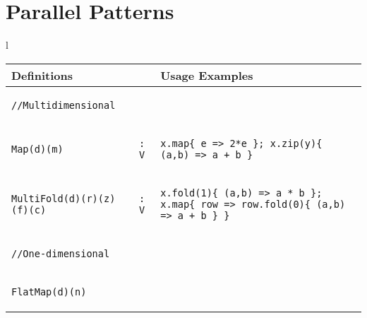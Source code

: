 \documentclass[pageno]{jpaper}
\begin{document}
 \section{Parallel Patterns}
\label{background}
\begin{figure*}
\small\centering
\begin{tabular}{l}
{\small\begin{tabular*}{0.95\textwidth}{ll|l}
\noalign{\hrule height 1.5pt}
{\bf Definitions} & & {\bf Usage Examples} \\ \hline

{\begin{lstlisting}[numbers=none,mathescape=true]
//Multidimensional
\end{lstlisting}} & & \\

{\begin{lstlisting}[numbers=none,mathescape=true]
Map(d)(m)
\end{lstlisting}} &

{\begin{lstlisting}[numbers=none,mathescape=true]
: V
\end{lstlisting}} &

{\begin{lstlisting}[numbers=none,mathescape=true]
x.map{ e => 2*e }; x.zip(y){ (a,b) => a + b }
\end{lstlisting}} \\

{\begin{lstlisting}[numbers=none,mathescape=true]
MultiFold(d)(r)(z)(f)(c)
\end{lstlisting}} &

{\begin{lstlisting}[numbers=none,mathescape=true]
: V
\end{lstlisting}} &

{\begin{lstlisting}[numbers=none,mathescape=true]
x.fold(1){ (a,b) => a * b }; x.map{ row => row.fold(0){ (a,b) => a + b } }
\end{lstlisting}} \\

{\begin{lstlisting}[numbers=none,mathescape=true]
//One-dimensional
\end{lstlisting}} & & \\

{\begin{lstlisting}[numbers=none,mathescape=true]
FlatMap(d)(n)
\end{lstlisting}} &


\end{tabular*}}
\end{tabular}
\end{figure*}
\end{document}
